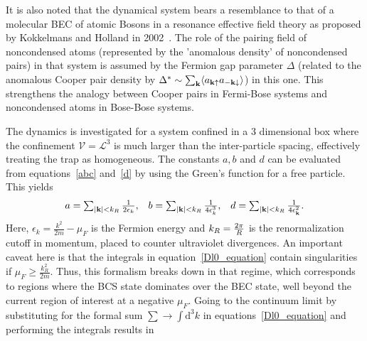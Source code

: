 \documentclass[a4paper,10pt]{article}
\begin{document}
It is also noted that the dynamical system bears a resemblance to that of a molecular BEC of atomic Bosons in a resonance effective field theory as proposed by Kokkelmans and Holland in 2002~\cite{kokkelmans:molbecdyn}. The role of the pairing field of noncondensed atoms (represented by the 'anomalous density' of noncondensed pairs) in that system is assumed by the Fermion gap parameter $\Delta$ (related to the anomalous Cooper pair density by $\Delta^* \sim \sum_{\bf k}\langle a_{{\bf k}\uparrow} a_{-{\bf k}\downarrow}\rangle$) in this one. This strengthens the analogy between Cooper pairs in Fermi-Bose systems and noncondensed atoms in Bose-Bose systems.

The dynamics is investigated for a system confined in a 3 dimensional box where the confinement $\mathcal{V}=\mathcal{L}^3$ is much larger than the inter-particle spacing, effectively treating the trap as homogeneous. The constants $a,b$ and $d$ can be evaluated from equations~\ref{abc} and~\ref{d} by using the Green's function for a free particle. This yields~\cite{machida:dynamics,huang:bcsbecgp}
\begin{equation} 
\label{Dl0_equation}
\begin{array}{lll}
a=\sum_{|{\bf k}|<k_R}\frac{1}{2\epsilon_{k}}, & b=\sum_{|{\bf k}|<k_R}\frac{1}{4\epsilon_{k}^3},& d=\sum_{|{\bf k}|<k_R}\frac{1}{4\epsilon^2_{\bf k}}.
\end{array}
\end{equation}
Here, $\epsilon_k=\frac{k^2}{2m}-\mu_F$ is the Fermion energy and $k_R={2\pi\over R}$ is the renormalization cutoff in momentum, placed to counter ultraviolet divergences. An important caveat here is that the integrals in equation~\ref{Dl0_equation} contain singularities if $\mu_F\geq\frac{k^2_R}{2m}$. Thus, this formalism breaks down in that regime, which corresponds to regions where the BCS state dominates over the BEC state, well beyond the current region of interest at a negative $\mu_F$. Going to the continuum limit by substituting for the formal sum $\sum \rightarrow \int\mathrm{d}^3k$ in equations~\ref{Dl0_equation} and performing the integrals results in
\end{document}
